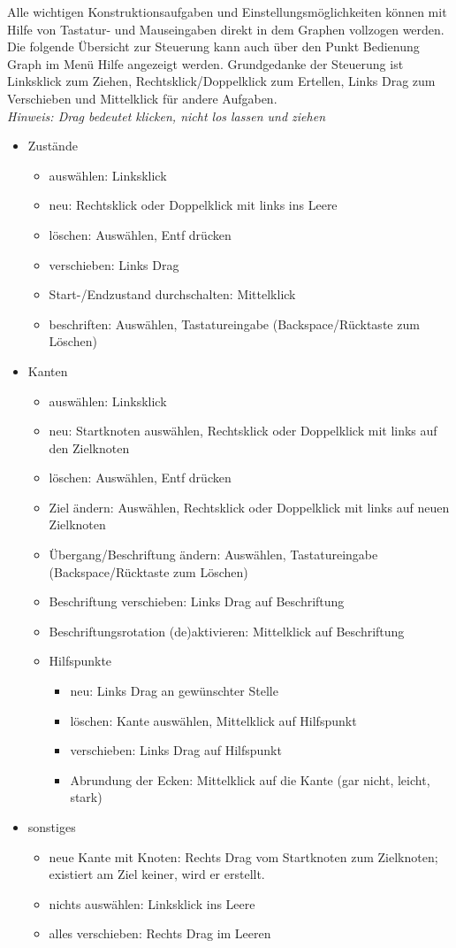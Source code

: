 Alle wichtigen Konstruktionsaufgaben und Einstellungsmöglichkeiten können mit Hilfe von Tastatur- und Mauseingaben direkt in dem Graphen vollzogen werden. Die folgende Übersicht zur Steuerung kann auch über den Punkt Bedienung Graph im Menü Hilfe angezeigt werden. Grundgedanke der Steuerung ist Linksklick zum Ziehen, Rechtsklick/Doppelklick zum Ertellen, Links Drag zum Verschieben und Mittelklick für andere Aufgaben.\\
\textit{Hinweis: Drag bedeutet klicken, nicht los lassen und ziehen}
\begin{itemize}                
\item Zustände
\begin{itemize}                
\item auswählen: Linksklick
\item neu: Rechtsklick oder Doppelklick mit links ins Leere
\item löschen: Auswählen, Entf drücken
\item verschieben: Links Drag
\item Start-/Endzustand durchschalten: Mittelklick
\item beschriften: Auswählen, Tastatureingabe (Backspace/Rücktaste zum Lö\-schen)
\end{itemize}
\item Kanten
\begin{itemize}                
\item auswählen: Linksklick
\item neu: Startknoten auswählen, Rechtsklick oder Doppelklick mit links auf den Zielknoten
\item löschen: Auswählen, Entf drücken
\item Ziel ändern: Auswählen, Rechtsklick oder Doppelklick mit links auf neuen Zielknoten
\item Übergang/Beschriftung ändern: Auswählen, Tastatureingabe (Backspace/\-Rücktaste zum Löschen)
\item Beschriftung verschieben: Links Drag auf Beschriftung
\item Beschriftungsrotation (de)aktivieren: Mittelklick auf Beschriftung
\item Hilfspunkte
\begin{itemize}                
\item neu: Links Drag an gewünschter Stelle
\item löschen: Kante auswählen, Mittelklick auf Hilfspunkt
\item verschieben: Links Drag auf Hilfspunkt
\item Abrundung der Ecken: Mittelklick auf die Kante (gar nicht, leicht, stark)
\end{itemize}
\end{itemize}
\item sonstiges
\begin{itemize}                
\item neue Kante mit Knoten: Rechts Drag vom Startknoten zum Zielknoten; existiert am Ziel keiner, wird er erstellt.
\item nichts auswählen: Linksklick ins Leere
\item alles verschieben: Rechts Drag im Leeren
\end{itemize}
\end{itemize}
